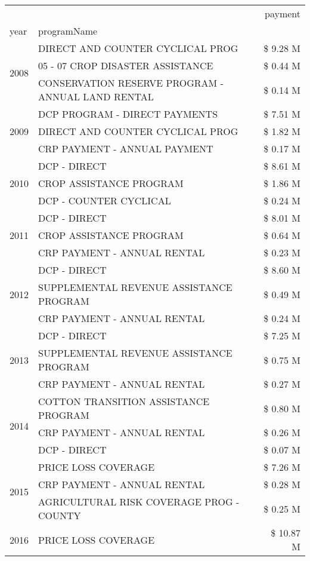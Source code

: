 \begin{tabular}{llr}
\toprule
 &  & payment \\
year & programName &  \\
\midrule
\multirow[t]{3}{*}{2008} & DIRECT AND COUNTER CYCLICAL PROG & \$ 9.28 M \\
 & 05 - 07 CROP DISASTER ASSISTANCE & \$ 0.44 M \\
 & CONSERVATION RESERVE PROGRAM - ANNUAL LAND RENTAL & \$ 0.14 M \\
\cline{1-3}
\multirow[t]{3}{*}{2009} & DCP PROGRAM - DIRECT PAYMENTS & \$ 7.51 M \\
 & DIRECT AND COUNTER CYCLICAL PROG & \$ 1.82 M \\
 & CRP PAYMENT - ANNUAL PAYMENT & \$ 0.17 M \\
\cline{1-3}
\multirow[t]{3}{*}{2010} & DCP - DIRECT & \$ 8.61 M \\
 & CROP ASSISTANCE PROGRAM & \$ 1.86 M \\
 & DCP - COUNTER CYCLICAL & \$ 0.24 M \\
\cline{1-3}
\multirow[t]{3}{*}{2011} & DCP - DIRECT & \$ 8.01 M \\
 & CROP ASSISTANCE PROGRAM & \$ 0.64 M \\
 & CRP PAYMENT - ANNUAL RENTAL & \$ 0.23 M \\
\cline{1-3}
\multirow[t]{3}{*}{2012} & DCP - DIRECT & \$ 8.60 M \\
 & SUPPLEMENTAL REVENUE ASSISTANCE PROGRAM & \$ 0.49 M \\
 & CRP PAYMENT - ANNUAL RENTAL & \$ 0.24 M \\
\cline{1-3}
\multirow[t]{3}{*}{2013} & DCP - DIRECT & \$ 7.25 M \\
 & SUPPLEMENTAL REVENUE ASSISTANCE PROGRAM & \$ 0.75 M \\
 & CRP PAYMENT - ANNUAL RENTAL & \$ 0.27 M \\
\cline{1-3}
\multirow[t]{3}{*}{2014} & COTTON TRANSITION ASSISTANCE PROGRAM & \$ 0.80 M \\
 & CRP PAYMENT - ANNUAL RENTAL & \$ 0.26 M \\
 & DCP - DIRECT & \$ 0.07 M \\
\cline{1-3}
\multirow[t]{3}{*}{2015} & PRICE LOSS COVERAGE & \$ 7.26 M \\
 & CRP PAYMENT - ANNUAL RENTAL & \$ 0.28 M \\
 & AGRICULTURAL RISK COVERAGE PROG - COUNTY & \$ 0.25 M \\
\cline{1-3}
\multirow[t]{3}{*}{2016} & PRICE LOSS COVERAGE & \$ 10.87 M \\

\end{tabular}
